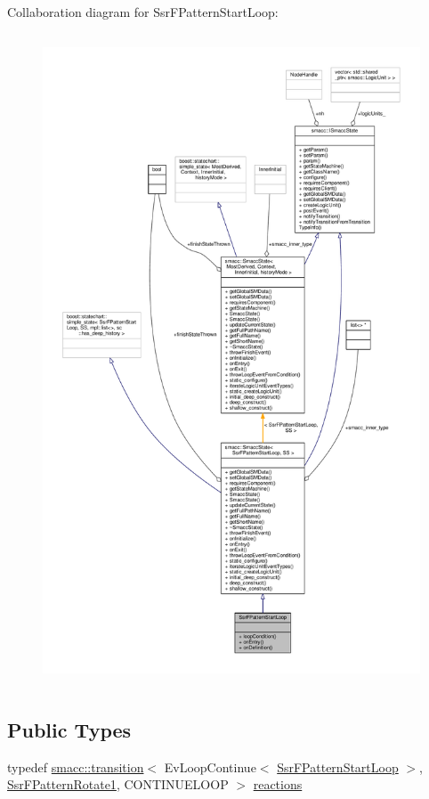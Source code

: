 Collaboration diagram for Ssr\+F\+Pattern\+Start\+Loop\+:
\nopagebreak
\begin{figure}[H]
\begin{center}
\leavevmode
\includegraphics[height=550pt]{structSsrFPatternStartLoop__coll__graph}
\end{center}
\end{figure}
\subsection*{Public Types}
\begin{DoxyCompactItemize}
\item 
typedef \hyperlink{classsmacc_1_1transition}{smacc\+::transition}$<$ Ev\+Loop\+Continue$<$ \hyperlink{structSsrFPatternStartLoop}{Ssr\+F\+Pattern\+Start\+Loop} $>$, \hyperlink{structSsrFPatternRotate1}{Ssr\+F\+Pattern\+Rotate1}, C\+O\+N\+T\+I\+N\+U\+E\+L\+O\+OP $>$ \hyperlink{structSsrFPatternStartLoop_aac85f43e96a9f790df66bf07d1dffc75}{reactions}
\end{DoxyCompactItemize}
